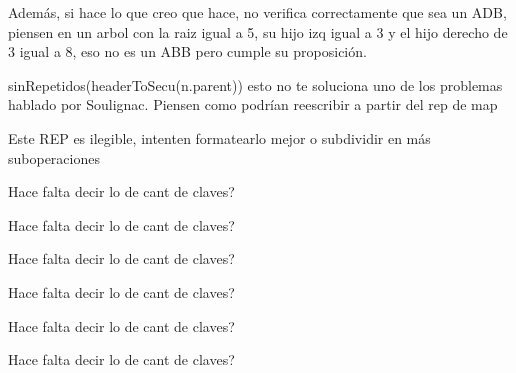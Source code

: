 \begin{DoxyRefList}
Además, si hace lo que creo que hace, no verifica correctamente que sea un A\+DB, piensen en un arbol con la raiz igual a 5, su hijo izq igual a 3 y el hijo derecho de 3 igual a 8, eso no es un A\+BB pero cumple su proposición.

sin\+Repetidos(header\+To\+Secu(n.\+parent)) esto no te soluciona uno de los problemas hablado por Soulignac. Piensen como podrían reescribir a partir del rep de map 
\item[\label{bug__bug000020}%
\hypertarget{bug__bug000020}{}%
Grupo \hyperlink{classaed2_1_1map_amgrpd5e8970aaf64693c88c5cfe5802755da}{Estructura de representación} ]Este R\+EP es ilegible, intenten formatearlo mejor o subdividir en más suboperaciones

Hace falta decir lo de cant de claves?

Hace falta decir lo de cant de claves?

Hace falta decir lo de cant de claves?

Hace falta decir lo de cant de claves?

Hace falta decir lo de cant de claves?

Hace falta decir lo de cant de claves?
\end{DoxyRefList}